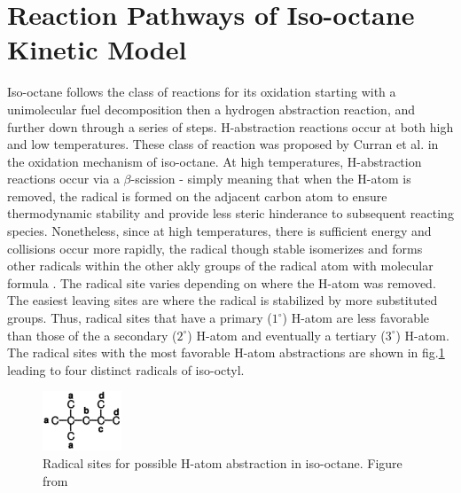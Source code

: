 \section{Reaction Pathways of Iso-octane Kinetic Model}
Iso-octane follows the class of reactions for its oxidation starting with a unimolecular fuel decomposition then a hydrogen abstraction reaction, and further down through a series of steps. H-abstraction reactions occur at both high and low temperatures. These class of reaction was proposed by Curran et al.\cite{Curran2002AOxidation} in the oxidation mechanism of iso-octane. At high temperatures, H-abstraction reactions occur via a $\beta$-scission - simply meaning that when the H-atom is removed, the radical is formed on the adjacent carbon atom to ensure thermodynamic stability and provide less steric hinderance to subsequent reacting species. Nonetheless, since at high temperatures, there is sufficient energy and collisions occur more rapidly, the radical though stable isomerizes and forms other radicals within the other akly groups of the radical atom with molecular formula . The radical site varies depending on where the H-atom was removed. The easiest leaving sites are where the radical is stabilized by more substituted groups. Thus, radical sites that have a primary ($1^{\circ}$) H-atom are less favorable than those of the a secondary ($2^{\circ}$) H-atom and eventually a tertiary ($3^{\circ}$) H-atom. The radical sites with the most favorable H-atom abstractions are shown in fig.\ref{fig:ic8-radicalsites} leading to four distinct radicals of iso-octyl.
\begin{figure}[!htp]
    \centering
    \includegraphics[keepaspectratio]{images/ic8-radical-sites.png}
    \caption{Radical sites for possible H-atom abstraction in iso-octane. Figure from \cite{Curran2002AOxidation}}
    \label{fig:ic8-radicalsites}
\end{figure}

